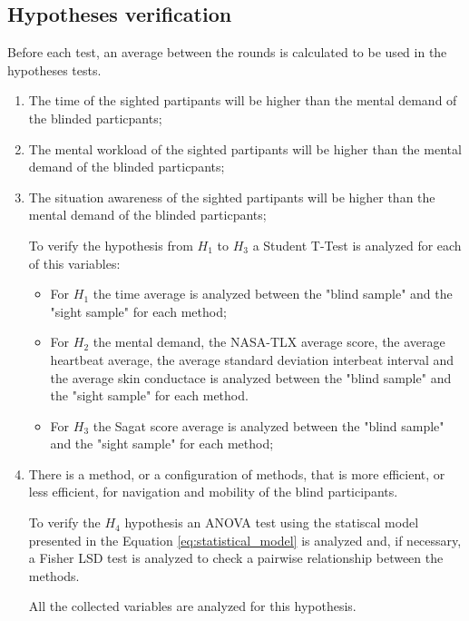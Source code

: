 \subsection{Hypotheses verification}

Before each test, an average between the rounds is calculated to be used in the hypotheses tests.

\begin{enumerate}[label = $H_\arabic*$:]
    \setlength\itemindent{2ex}
    \item The time of the sighted partipants will be higher than the mental demand of the blinded particpants;
    \item The mental workload of the sighted partipants will be higher than the mental demand of the blinded particpants;
    \item The situation awareness of the sighted partipants will be higher than the mental demand of the blinded particpants;
    
    To verify the hypothesis from $H_1$ to $H_3$ a Student T-Test is analyzed for each of this variables:
    \begin{itemize}
        \item For $H_1$ the time average is analyzed between the "blind sample" and the "sight sample" for each method;
        \item For $H_2$ the mental demand, the NASA-TLX average score, the average heartbeat average, the average standard deviation interbeat interval and the average skin conductace is analyzed between the "blind sample" and the "sight sample" for each method.
        \item For $H_3$ the Sagat score average is analyzed between the "blind sample" and the "sight sample" for each method;
    \end{itemize}

    \item There is a method, or a configuration of methods, that is more efficient, or less efficient, for navigation and mobility of the blind participants.
    
    To verify the $H_4$ hypothesis an ANOVA test using the statiscal model presented in the Equation \ref{eq:statistical_model} is analyzed and, if necessary, a Fisher LSD test is analyzed to check a pairwise relationship between the methods.

    All the collected variables are analyzed for this hypothesis.
\end{enumerate}
